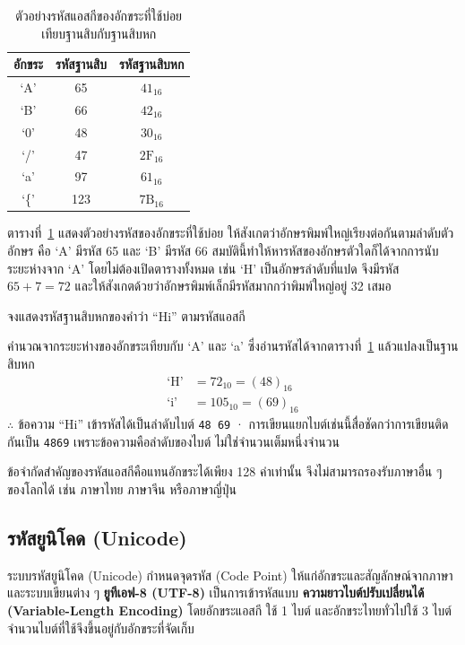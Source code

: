 \begin{table}[H]
\centering
\caption{ตัวอย่างรหัสแอสกีของอักขระที่ใช้บ่อย เทียบฐานสิบกับฐานสิบหก}
\label{tab:ascii}
\begin{tabular}{|c|c|c|}
\hline
\textbf{อักขระ} & \textbf{รหัสฐานสิบ} & \textbf{รหัสฐานสิบหก} \\
\hline
`A' & 65 & $41_{16}$ \\
`B' & 66 & $42_{16}$ \\
`0' & 48 & $30_{16}$ \\
`/' & 47 & $2\mathrm{F}_{16}$ \\
`a' & 97 & $61_{16}$ \\
`\{' & 123 & $7\mathrm{B}_{16}$ \\
\hline
\end{tabular}
\end{table}

ตารางที่~\ref{tab:ascii} แสดงตัวอย่างรหัสของอักขระที่ใช้บ่อย ให้สังเกตว่าอักษรพิมพ์ใหญ่เรียงต่อกันตามลำดับตัวอักษร คือ `A' มีรหัส 65 และ `B' มีรหัส 66 สมบัตินี้ทำให้หารหัสของอักษรตัวใดก็ได้จากการนับระยะห่างจาก `A' โดยไม่ต้องเปิดตารางทั้งหมด เช่น `H' เป็นอักษรลำดับที่แปด จึงมีรหัส $65+7 = 72$ และให้สังเกตด้วยว่าอักษรพิมพ์เล็กมีรหัสมากกว่าพิมพ์ใหญ่อยู่ 32 เสมอ

\begin{ex}
\label{ex:ascii-encode-hi}
จงแสดงรหัสฐานสิบหกของคำว่า ``Hi'' ตามรหัสแอสกี
\end{ex}
\begin{solution}
คำนวณจากระยะห่างของอักขระเทียบกับ `A' และ `a' ซึ่งอ่านรหัสได้จากตารางที่~\ref{tab:ascii} แล้วแปลงเป็นฐานสิบหก
\begin{align*}
\text{`H'} &= 72_{10} = (48)_{16}\\
\text{`i'} &= 105_{10} = (69)_{16}
\end{align*}
$\therefore$ ข้อความ ``Hi'' เข้ารหัสได้เป็นลำดับไบต์ \texttt{48 69} · การเขียนแยกไบต์เช่นนี้สื่อชัดกว่าการเขียนติดกันเป็น \texttt{4869} เพราะข้อความคือลำดับของไบต์ ไม่ใช่จำนวนเต็มหนึ่งจำนวน \solhere
\end{solution}

\begin{rem}
\label{rem:ascii-limitation}
ข้อจำกัดสำคัญของรหัสแอสกีคือแทนอักขระได้เพียง 128 ค่าเท่านั้น จึงไม่สามารถรองรับภาษาอื่น ๆ ของโลกได้ เช่น ภาษาไทย ภาษาจีน หรือภาษาญี่ปุ่น
\end{rem}

\subsection{รหัสยูนิโคด (Unicode)}
\label{ssec:unicode-representation}
ระบบรหัสยูนิโคด (Unicode) กำหนดจุดรหัส (Code Point) ให้แก่อักขระและสัญลักษณ์จากภาษาและระบบเขียนต่าง ๆ \textbf{ยูทีเอฟ-8 (UTF-8)} เป็นการเข้ารหัสแบบ \textbf{ความยาวไบต์ปรับเปลี่ยนได้ (Variable-Length Encoding)} โดยอักขระแอสกี ใช้ 1 ไบต์ และอักขระไทยทั่วไปใช้ 3 ไบต์ จำนวนไบต์ที่ใช้จึงขึ้นอยู่กับอักขระที่จัดเก็บ~\parencite{patterson2020organization}

